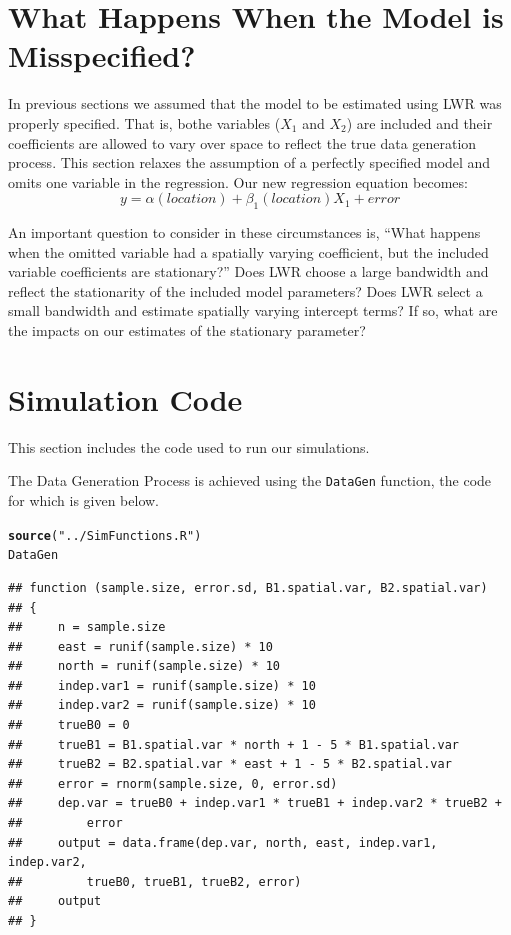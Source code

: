 \documentclass{article}\usepackage{graphicx, color}
\makeatletter
\newcommand{\hlfunctioncall}[1]{\textcolor[rgb]{0.501960784313725,0,0.329411764705882}{\textbf{#1}}}%
\newcommand{\hlstring}[1]{\textcolor[rgb]{0.6,0.6,1}{#1}}%
\newenvironment{kframe}{%
 \def\at@end@of@kframe{}%
 \ifinner\ifhmode%
  \def\at@end@of@kframe{\end{minipage}}%
  \begin{minipage}{\columnwidth}%
 \fi\fi%
 \def\FrameCommand##1{\hskip\@totalleftmargin \hskip-\fboxsep
 \colorbox{shadecolor}{##1}\hskip-\fboxsep
     \hskip-\linewidth \hskip-\@totalleftmargin \hskip\columnwidth}%
 \MakeFramed {\advance\hsize-\width
   \@totalleftmargin\z@ \linewidth\hsize
   \@setminipage}}%
 {\par\unskip\endMakeFramed%
 \at@end@of@kframe}
\newenvironment{knitrout}{}{} %
\makeatother
\begin{document}
\section{What Happens When the Model is Misspecified?}

In previous sections we assumed that the model to be estimated using LWR was properly specified. That is, bothe variables ($X_1$ and $X_2$) are included and their coefficients are allowed to vary over space to reflect the true data generation process. This section relaxes the assumption of a perfectly specified model and omits one variable in the regression. Our new regression equation becomes:
\begin{equation}
y = \alpha (location) + \beta _1 (location) X_1 + error
\end{equation}

An important question to consider in these circumstances is, ``What happens when the omitted variable had a spatially varying coefficient, but the included variable coefficients are stationary?'' Does LWR choose a large bandwidth and reflect the stationarity of the included model parameters? Does LWR select a small bandwidth and estimate spatially varying intercept terms? If so, what are the impacts on our estimates of the stationary parameter?


\section{Simulation Code}
This section includes the code used to run our simulations.

The Data Generation Process is achieved using the \texttt{DataGen} function, the code for which is given below. 
\begin{knitrout}
\color{fgcolor}\begin{kframe}
\begin{alltt}
\hlfunctioncall{source}(\hlstring{"../SimFunctions.R"})
DataGen
\end{alltt}
\begin{verbatim}
## function (sample.size, error.sd, B1.spatial.var, B2.spatial.var) 
## {
##     n = sample.size
##     east = runif(sample.size) * 10
##     north = runif(sample.size) * 10
##     indep.var1 = runif(sample.size) * 10
##     indep.var2 = runif(sample.size) * 10
##     trueB0 = 0
##     trueB1 = B1.spatial.var * north + 1 - 5 * B1.spatial.var
##     trueB2 = B2.spatial.var * east + 1 - 5 * B2.spatial.var
##     error = rnorm(sample.size, 0, error.sd)
##     dep.var = trueB0 + indep.var1 * trueB1 + indep.var2 * trueB2 + 
##         error
##     output = data.frame(dep.var, north, east, indep.var1, indep.var2, 
##         trueB0, trueB1, trueB2, error)
##     output
## }
\end{verbatim}
\end{kframe}
\end{knitrout}
\end{document}
